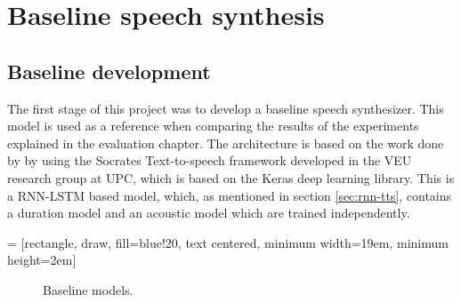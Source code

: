 \chapter{Baseline speech synthesis}



\section{Baseline development}

The first stage of this project was to develop a baseline speech synthesizer. This model is used as a reference when comparing the results of the experiments explained in the evaluation chapter. The architecture is based on the work done by \cite{pascual2016deep} by using the Socrates Text-to-speech framework developed in the VEU research group at UPC, which is based on the Keras deep learning library. This is a RNN-LSTM based model, which, as mentioned in section \ref{sec:rnn-tts}, contains a duration model and an acoustic model which are trained independently.

 = [rectangle, draw, fill=blue!20, text centered, minimum width=19em, minimum height=2em]

\begin{figure}[h]
    \centering
    \caption{Baseline models.}
    \label{fig:lstm-tts}
\end{figure}

